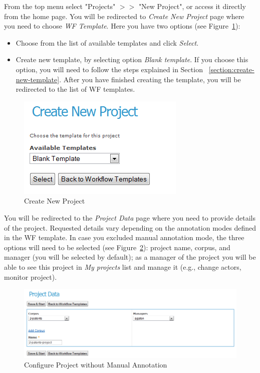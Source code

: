 From the top menu select "Projects" $>>$ "New Project", or access it 
  directly from the home page. You will be redirected to \emph{Create New 
  Project} page where you need to choose \emph{WF Template}. Here
  you have two options (see Figure~\ref{fig:createnewproject}):
  \begin{itemize}
    \item Choose from the list of available templates and click \emph{Select}.
    \item Create new template, by selecting option \emph{Blank template}.
    If you choose this option, you will need to follow the steps explained
    in Section ~\ref{section:create-new-template}. 
    After you have finished creating the template, you will be redirected to
    the list of WF templates.
  \end{itemize}
\begin{figure}[htb]
\centering
\includegraphics[scale=0.35]{createnewproject}
\caption{Create New Project}
\label{fig:createnewproject}
\end{figure}
You will be redirected to the \emph{Project Data} page where you need to 
provide details of the project. Requested details vary depending on the
annotation modes defined in the WF template. In case you excluded manual
annotation mode, the three options will need to be selected (see
Figure~\ref{fig:projectdata}): project name,
corpus, and manager (you will be selected by default); as a manager of the
project you will be able to see this project in \emph{My projects} list and
manage it (e.g., change actors, monitor project).
\begin{figure}[h!]
\centering
\includegraphics[scale=0.34]{projectdata}
\caption{Configure Project without Manual Annotation}
\label{fig:projectdata}
\end{figure}

